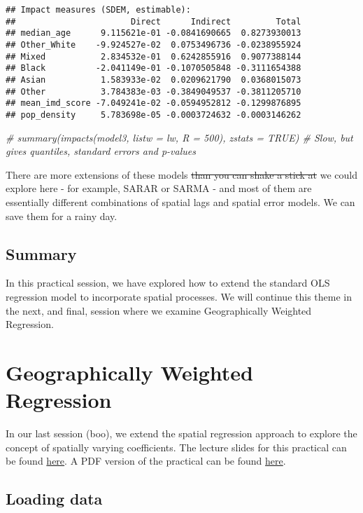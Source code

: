 \documentclass[
]{book}
\newenvironment{Shaded}{\begin{snugshade}}{\end{snugshade}}
\newcommand{\CommentTok}[1]{\textcolor[rgb]{0.56,0.35,0.01}{\textit{#1}}}
\begin{document}
\begin{verbatim}
## Impact measures (SDEM, estimable):
##                       Direct      Indirect         Total
## median_age      9.115621e-01 -0.0841690665  0.8273930013
## Other_White    -9.924527e-02  0.0753496736 -0.0238955924
## Mixed           2.834532e-01  0.6242855916  0.9077388144
## Black          -2.041149e-01 -0.1070505848 -0.3111654388
## Asian           1.583933e-02  0.0209621790  0.0368015073
## Other           3.784383e-03 -0.3849049537 -0.3811205710
## mean_imd_score -7.049241e-02 -0.0594952812 -0.1299876895
## pop_density     5.783698e-05 -0.0003724632 -0.0003146262
\end{verbatim}

\begin{Shaded}
\begin{Highlighting}[]
\CommentTok{\# summary(impacts(model3, listw = lw, R = 500), zstats = TRUE) \# Slow, but gives quantiles, standard errors and p{-}values}
\end{Highlighting}
\end{Shaded}

There are more extensions of these models \sout{than you can shake a stick at} we could explore here - for example, SARAR or SARMA - and most of them are essentially different combinations of spatial lags and spatial error models. We can save them for a rainy day.

\hypertarget{summary-2}{%
\section{Summary}\label{summary-2}}

In this practical session, we have explored how to extend the standard OLS regression model to incorporate spatial processes. We will continue this theme in the next, and final, session where we examine Geographically Weighted Regression.

\hypertarget{gwr}{%
\chapter{Geographically Weighted Regression}\label{gwr}}

In our last session (boo), we extend the spatial regression approach to explore the concept of spatially varying coefficients. The lecture slides for this practical can be found \href{}{here}. A PDF version of the practical can be found \href{}{here}.

\hypertarget{loading-data}{%
\section{Loading data}\label{loading-data}}
\end{document}
